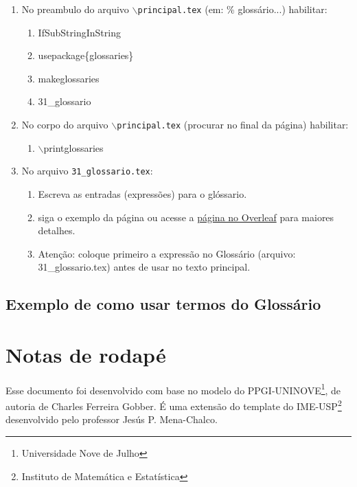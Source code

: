 \begin{enumerate}
    \item No preambulo do arquivo {\color{red}$\backslash$\texttt{principal.tex}} (em: \% glossário...) habilitar:
    \begin{enumerate}
        \item IfSubStringInString
        \item usepackage\{glossaries\}
        \item makeglossaries
        \item 31\_glossario
    \end{enumerate}
    \item No corpo do arquivo {\color{red}$\backslash$\texttt{principal.tex}} (procurar no final da página) habilitar:
    \begin{enumerate}
        \item $\backslash$printglossaries
    \end{enumerate}
    \item No arquivo {\color{red}\texttt{31\_glossario.tex}}:
    \begin{enumerate}
        \item Escreva as entradas (expressões) para o glóssario.
        \item siga o exemplo da página ou acesse a \hyperlink{https://pt.overleaf.com/learn/latex/Glossaries}{página no Overleaf} para maiores detalhes.
        \item {\color{red}Atenção:} coloque primeiro a expressão no Glossário (arquivo: 31\_glossario.tex) antes de usar no texto principal.
    \end{enumerate}
\end{enumerate}

\subsection{Exemplo de como usar termos do Glossário}


\newpage
\section{Notas de rodapé}
Esse documento foi desenvolvido com base no modelo do PPGI-UNINOVE\footnote{Universidade Nove de Julho}, de autoria de Charles Ferreira Gobber.
É uma extensão do template do IME-USP\footnote{Instituto de Matemática e Estatística} desenvolvido pelo professor Jesús P. Mena-Chalco.

